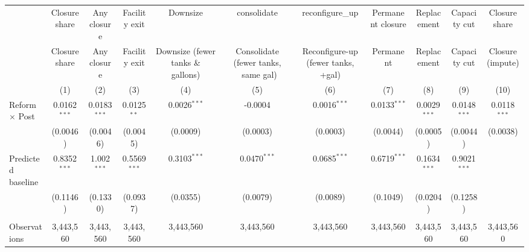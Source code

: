 
\begingroup
\centering
\begin{tabular}{lcccccccccc}
   \toprule
                                    & Closure share  & Any closure    & Facility exit  & Downsize                           & consolidate                          & reconfigure\_up                    & Permanent closure & Replacement    & Capacity cut   & Closure share\\  
                                    & Closure share  & Any closure    & Facility exit  & Downsize (fewer tanks \& gallons)  & Consolidate (fewer tanks, ~same gal) & Reconfigure-up (fewer tanks, +gal) & Permanent         & Replacement    & Capacity cut   & Closure (impute) \\   
                                    & (1)            & (2)            & (3)            & (4)                                & (5)                                  & (6)                                & (7)               & (8)            & (9)            & (10)\\  
   \midrule 
   Reform $\times$ Post             & 0.0162$^{***}$ & 0.0183$^{***}$ & 0.0125$^{**}$  & 0.0026$^{***}$                     & -0.0004                              & 0.0016$^{***}$                     & 0.0133$^{***}$    & 0.0029$^{***}$ & 0.0148$^{***}$ & 0.0118$^{***}$\\   
                                    & (0.0046)       & (0.0046)       & (0.0045)       & (0.0009)                           & (0.0003)                             & (0.0003)                           & (0.0044)          & (0.0005)       & (0.0044)       & (0.0038)\\   
   Predicted baseline               & 0.8352$^{***}$ & 1.002$^{***}$  & 0.5569$^{***}$ & 0.3103$^{***}$                     & 0.0470$^{***}$                       & 0.0685$^{***}$                     & 0.6719$^{***}$    & 0.1634$^{***}$ & 0.9021$^{***}$ &   \\   
                                    & (0.1146)       & (0.1330)       & (0.0937)       & (0.0355)                           & (0.0079)                             & (0.0089)                           & (0.1049)          & (0.0204)       & (0.1258)       &   \\   
    \\
   Observations                     & 3,443,560      & 3,443,560      & 3,443,560      & 3,443,560                          & 3,443,560                            & 3,443,560                          & 3,443,560         & 3,443,560      & 3,443,560      & 3,443,560\\  

\end{tabular}

